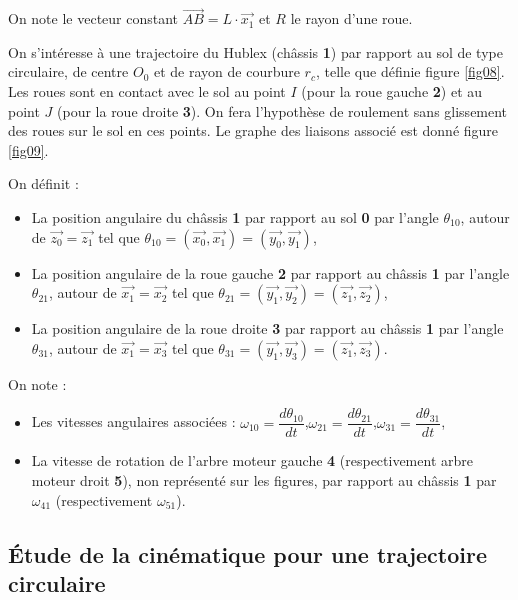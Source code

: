 On note le vecteur constant $\overrightarrow{AB}=L\cdot \vec{x_1}$ et $R$ le rayon d'une roue.

On s'intéresse à une trajectoire du Hublex (châssis \textbf{1}) par rapport au sol de type circulaire, de centre
$O_0$ et de rayon de courbure $r_c$, telle que définie figure \ref{fig08}. Les roues sont en contact avec le sol au point $I$ (pour la roue gauche \textbf{2}) et au point $J$ (pour la roue droite \textbf{3}). On fera l'hypothèse de roulement sans glissement des roues sur le sol en ces points. Le graphe des liaisons associé est donné figure \ref{fig09}.

On définit :
\begin{itemize}
 \item La position angulaire du châssis \textbf{1} par rapport au sol \textbf{0} par l'angle $\theta_{10}$, autour de $\vec{z_0}= \vec{z_1}$ tel que $\theta_{10}=(\vec{x_0},\vec{x_1})=(\vec{y_0},\vec{y_1})$,
 \item La position angulaire de la roue gauche \textbf{2} par rapport au châssis \textbf{1} par l'angle $\theta_{21}$, autour de $\vec{x_1}=\vec{x_2}$ tel que $\theta_{21}=(\vec{y_1},\vec{y_2})=(\vec{z_1},\vec{z_2})$,
 \item La position angulaire de la roue droite \textbf{3} par rapport au châssis \textbf{1} par l'angle $\theta_{31}$, autour de $\vec{x_1}=\vec{x_3}$ tel que $\theta_{31}=(\vec{y_1},\vec{y_3})=(\vec{z_1},\vec{z_3})$.
\end{itemize}

\newpage

On note :
\begin{itemize}
 \item Les vitesses angulaires associées : $\omega_{10}=\dfrac{d\theta_{10}}{dt}$,$\omega_{21}=\dfrac{d\theta_{21}}{dt}$,$\omega_{31}=\dfrac{d\theta_{31}}{dt}$,
 \item La vitesse de rotation de l'arbre moteur gauche \textbf{4} (respectivement arbre moteur droit \textbf{5}), non représenté sur les figures, par rapport au châssis \textbf{1} par $\omega_{41}$ (respectivement $\omega_{51}$).
\end{itemize}

\subsection{Étude de la cinématique pour une trajectoire circulaire}


